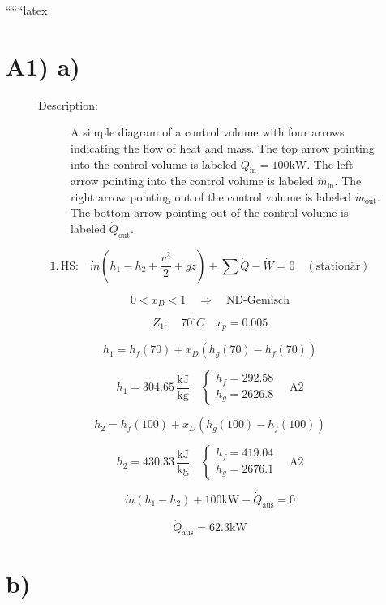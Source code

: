 
``````latex


\section*{A1) a)}

\begin{figure}[h!]
\centering
\begin{minipage}{0.5\textwidth}
\centering
\begin{description}
\item[Description:] A simple diagram of a control volume with four arrows indicating the flow of heat and mass. The top arrow pointing into the control volume is labeled $\dot{Q}_\text{in} = 100 \text{kW}$. The left arrow pointing into the control volume is labeled $\dot{m}_\text{in}$. The right arrow pointing out of the control volume is labeled $\dot{m}_\text{out}$. The bottom arrow pointing out of the control volume is labeled $\dot{Q}_\text{out}$.
\end{description}
\end{minipage}
\end{figure}

\[
1. \, \text{HS:} \quad \dot{m} (h_1 - h_2 + \frac{v^2}{2} + gz) + \sum \dot{Q} - \dot{W} = 0 \quad (\text{stationär})
\]

\[
0 < x_D < 1 \quad \Rightarrow \quad \text{ND-Gemisch}
\]

\[
Z_1: \quad 70^\circ C \quad x_p = 0.005
\]

\[
h_1 = h_f(70) + x_D (h_g(70) - h_f(70))
\]

\[
h_1 = 304.65 \, \frac{\text{kJ}}{\text{kg}} \quad \left\{ \begin{array}{l} h_f = 292.58 \\ h_g = 2626.8 \end{array} \right. \quad \text{A2}
\]

\[
h_2 = h_f(100) + x_D (h_g(100) - h_f(100))
\]

\[
h_2 = 430.33 \, \frac{\text{kJ}}{\text{kg}} \quad \left\{ \begin{array}{l} h_f = 419.04 \\ h_g = 2676.1 \end{array} \right. \quad \text{A2}
\]

\[
\dot{m} (h_1 - h_2) + 100 \text{kW} - \dot{Q}_\text{aus} = 0
\]

\[
\dot{Q}_\text{aus} = 62.3 \text{kW}
\]

\section*{b)}

